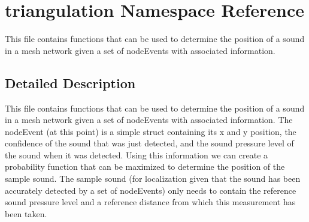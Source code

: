 \hypertarget{namespacetriangulation}{\section{triangulation Namespace Reference}
\label{namespacetriangulation}
}


This file contains functions that can be used to determine the position of a sound in a mesh network given a set of node\-Events with associated information.  




\subsection{Detailed Description}
This file contains functions that can be used to determine the position of a sound in a mesh network given a set of node\-Events with associated information. The node\-Event (at this point) is a simple struct containing its x and y position, the confidence of the sound that was just detected, and the sound pressure level of the sound when it was detected. Using this information we can create a probability function that can be maximized to determine the position of the sample sound. The sample sound (for localization given that the sound has been accurately detected by a set of node\-Events) only needs to contain the reference sound pressure level and a reference distance from which this measurement has been taken. 